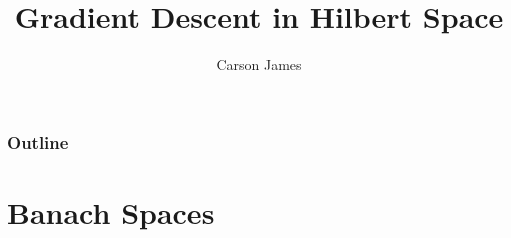 \documentclass[notheorems]{beamer}
\title{Gradient Descent in Hilbert Space}
\author{Carson James}
\theoremstyle{definition}
\theoremstyle{definition}
\begin{document}
\frame{\titlepage}

\begin{frame}
\frametitle{Outline}
\tableofcontents
	
\end{frame}

%	

\section{Banach Spaces}
\end{document}
